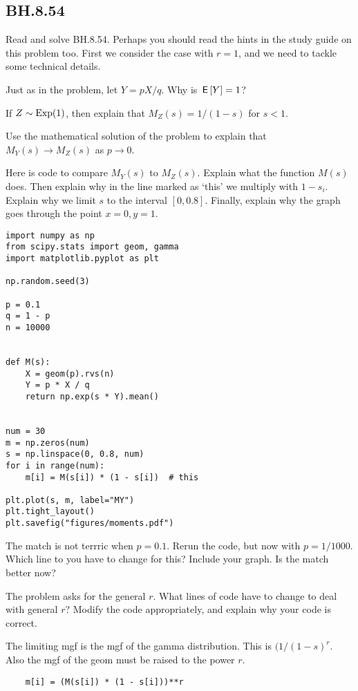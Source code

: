 \subsection{BH.8.54}
\label{sec:bh.8.54}


Read and solve BH.8.54. Perhaps you should read the hints in the study guide on this problem too.
First we consider the case with $r=1$, and we need to tackle some technical details.

\begin{exercise}
Just as in the problem, let $Y=p X/ q$. Why is $\,\mathsf{E}\left[Y\right] = 1$?
\end{exercise}

\begin{exercise}
If $Z\sim\mathrm{Exp}(1)$, then explain that $M_Z(s) = 1/(1-s)$ for $s<1$.
\end{exercise}

\begin{exercise}
Use the mathematical solution of the problem to explain that $M_Y(s)\to M_Z(s)$ as $p\to 0$.
\end{exercise}


\begin{exercise}
Here is code to compare $M_Y(s)$ to $M_{Z}(s)$. Explain what the function $M(s)$ does. Then explain why in the line marked as `this' we multiply with $1-s_{i}$.  Explain why we limit $s$ to the interval $[0, 0.8]$. Finally, explain why the graph goes through the point $x=0, y = 1$.

\begin{verbatim}
import numpy as np
from scipy.stats import geom, gamma
import matplotlib.pyplot as plt

np.random.seed(3)

p = 0.1
q = 1 - p
n = 10000


def M(s):
    X = geom(p).rvs(n)
    Y = p * X / q
    return np.exp(s * Y).mean()


num = 30
m = np.zeros(num)
s = np.linspace(0, 0.8, num)
for i in range(num):
    m[i] = M(s[i]) * (1 - s[i])  # this

plt.plot(s, m, label="MY")
plt.tight_layout()
plt.savefig("figures/moments.pdf")
\end{verbatim}
\end{exercise}

\begin{exercise}
The match is not terrric when $p=0.1$. Rerun the code, but now with $p=1/1000$. Which line to you have to change for this? Include your graph. Is the match better now?
\end{exercise}

\begin{exercise}
The problem asks for the general $r$. What lines of code have to change to deal with general $r$? Modify the code appropriately, and explain why your code is correct.
\begin{solution}
The limiting mgf is the mgf of the gamma distribution. This is $(1/(1-s)^{r}$. Also the mgf of the geom must be raised to the power $r$.
\begin{verbatim}
    m[i] = (M(s[i]) * (1 - s[i]))**r
\end{verbatim}
\end{solution}
\end{exercise}
